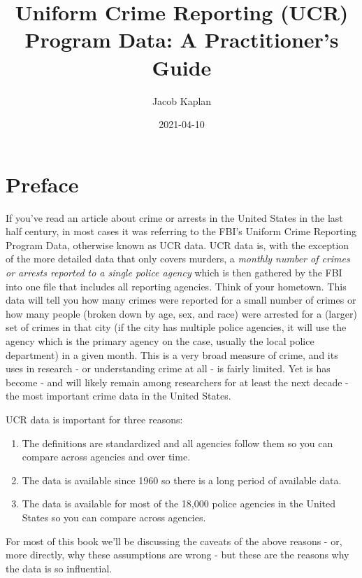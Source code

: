 \documentclass[
  12pt,
  openany]{book}
\title{Uniform Crime Reporting (UCR) Program Data: A Practitioner's Guide}
\author{Jacob Kaplan}
\date{2021-04-10}
\providecommand{\tightlist}{%
  \setlength{\itemsep}{0pt}\setlength{\parskip}{0pt}}
\begin{document}
\maketitle

{
\hypersetup{linkcolor=}
\setcounter{tocdepth}{2}
\tableofcontents
}
\hypertarget{preface}{%
\chapter{Preface}\label{preface}}

If you've read an article about crime or arrests in the United States in the last half century, in most cases it was referring to the FBI's Uniform Crime Reporting Program Data, otherwise known as UCR data. UCR data is, with the exception of the more detailed data that only covers murders, a \emph{monthly number of crimes or arrests reported to a single police agency} which is then gathered by the FBI into one file that includes all reporting agencies. Think of your hometown. This data will tell you how many crimes were reported for a small number of crimes or how many people (broken down by age, sex, and race) were arrested for a (larger) set of crimes in that city (if the city has multiple police agencies, it will use the agency which is the primary agency on the case, usually the local police department) in a given month. This is a very broad measure of crime, and its uses in research - or understanding crime at all - is fairly limited. Yet is has become - and will likely remain among researchers for at least the next decade - the most important crime data in the United States.

UCR data is important for three reasons:

\begin{enumerate}
\def\labelenumi{\arabic{enumi}.}
\tightlist
\item
  The definitions are standardized and all agencies follow them so you can compare across agencies and over time.
\item
  The data is available since 1960 so there is a long period of available data.
\item
  The data is available for most of the 18,000 police agencies in the United States so you can compare across agencies.
\end{enumerate}

For most of this book we'll be discussing the caveats of the above reasons - or, more directly, why these assumptions are wrong - but these are the reasons why the data is so influential.
\end{document}
